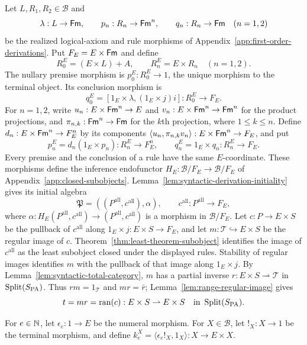 Let $L,R_1,R_2\in\mathcal B$ and
\[
 \lambda:L\to\mathsf{Fm},\qquad
 p_n:R_n\to\mathsf{Fm}^n,\qquad q_n:R_n\to\mathsf{Fm}\quad(n=1,2)
\]
be the realized logical-axiom and rule morphisms of
Appendix~\ref{app:first-order-derivations}.
Put $F_E=E\times\mathsf{Fm}$ and define
\[
 R^E_0=(E\times L)+A,\qquad
 R^E_n=E\times R_n\quad(n=1,2).
\]
The nullary premise morphism is $p^E_0:R^E_0\to1$, the
unique morphism to the terminal object. Its conclusion morphism is
\[
 q^E_0=[1_E\times\lambda,(1_E\times j)i]:R^E_0\to F_E.
\]
For $n=1,2$, write
$u_n:E\times\mathsf{Fm}^n\to E$ and
$v_n:E\times\mathsf{Fm}^n\to\mathsf{Fm}^n$ for the product projections,
and $\pi_{n,k}:\mathsf{Fm}^n\to\mathsf{Fm}$ for the $k$th projection,
where $1\le k\le n$.
Define $d_n:E\times\mathsf{Fm}^n\to F_E^n$ by its components
$\langle u_n,\pi_{n,k}v_n\rangle:E\times\mathsf{Fm}^n\to F_E$,
and put
\[
 p^E_n=d_n(1_E\times p_n):R_n^E\to F_E^n,\qquad
 q^E_n=1_E\times q_n:R_n^E\to F_E.
\]
Every premise and the conclusion of a rule have the same
$E$-coordinate. These morphisms define the inference endofunctor
$H_E:\mathcal B/F_E\to\mathcal B/F_E$
of Appendix~\ref{app:closed-subobjects}.
Lemma~\ref{lem:syntactic-derivation-initiality} gives its
initial algebra
\[
 \mathfrak P=((P^{\mathrm{all}},c^{\mathrm{all}}),\alpha),
 \qquad c^{\mathrm{all}}:P^{\mathrm{all}}\to F_E,
\]
where
$\alpha:H_E(P^{\mathrm{all}},c^{\mathrm{all}})
             \to(P^{\mathrm{all}},c^{\mathrm{all}})$
is a morphism in $\mathcal B/F_E$.
Let $c:P\to E\times S$ be the pullback of $c^{\mathrm{all}}$
along $1_E\times j:E\times S\to F_E$, and let
$m:\mathcal T\hookrightarrow E\times S$ be the regular image
of $c$. Theorem~\ref{thm:least-theorem-subobject} identifies
the image of $c^{\mathrm{all}}$ as the least subobject closed
under the displayed rules. Stability of regular images identifies
$m$ with the pullback of that image along $1_E\times j$.
By Lemma~\ref{lem:syntactic-total-category}, $m$ has a partial
inverse $r:E\times S\rightharpoonup\mathcal T$ in
$\operatorname{Split}(S_{\mathrm{PA}})$. Thus $rm=1_{\mathcal T}$ and $mr=\bar r$;
Lemma~\ref{lem:range-regular-image} gives
\[
 t=mr=\operatorname{ran}(c):E\times S\rightharpoonup E\times S
 \quad\text{in }\operatorname{Split}(S_{\mathrm{PA}}).
\]

For $e\in\mathbb N$, let $\epsilon_e:1\to E$ be the numeral
morphism. For $X\in\mathcal B$, let $!_X:X\to1$ be the
terminal morphism, and define
$k_e^X=\langle\epsilon_e!_X,1_X\rangle:X\to E\times X$.

